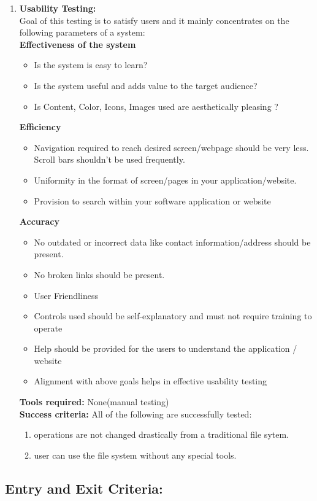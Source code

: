 \begin{enumerate}
\item \textbf{Usability Testing:} \\
Goal of this testing is to satisfy users and it mainly concentrates on the following parameters of a system: \\
\textbf{Effectiveness of the system}
\begin{itemize}
\item Is the system is easy to learn?
\item Is the system useful and adds value to the target audience?
\item Is Content, Color, Icons, Images used are aesthetically pleasing ?
\end{itemize}
\textbf{Efficiency}
\begin{itemize}
\item Navigation required to reach desired screen/webpage should be very less. Scroll bars shouldn’t be used frequently.
\item Uniformity in the format of screen/pages in your application/website.
\item Provision to search within your software application or website
\end{itemize}
\textbf{Accuracy}
\begin{itemize}
\item No outdated or incorrect data like contact information/address should be present.
\item No broken links should be present.
\item User Friendliness
\item Controls used should be self-explanatory and must not require training to operate
\item Help should be provided for the users to understand the application / website
\item Alignment with above goals helps in effective usability testing
\end{itemize}
\textbf{Tools required:} None(manual testing) \\
\textbf{Success criteria:} All of the following are successfully tested:
\begin{enumerate}
\item operations are not changed drastically from a traditional file sytem.
\item user can use the file system without any special tools.
\end{enumerate}
\end{enumerate}

\subsection{Entry and Exit Criteria:}

